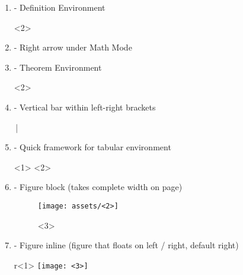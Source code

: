 \documentclass{article}
\begin{document}
\begin{enumerate}
\begin{codeblock}[tex]
\left\{ <1> \right\}
\end{codeblock}
    \item {} - Definition Environment
\begin{codeblock}[tex]
\begin{definition}[<1>]
    <2>
\end{definition}
\end{codeblock}
    \item {} - Right arrow under Math Mode
\begin{codeblock}[tex]
\rightarrow
\end{codeblock}
    \item {} - Theorem Environment
\begin{codeblock}[tex]
\begin{theorem}[<1>]
    <2>
\end{theorem}
\end{codeblock}
    \item {} - Vertical bar within left-right brackets
\begin{codeblock}[tex]
\,\middle |\,
\end{codeblock}
    \item {} - Quick framework for tabular environment
\begin{codeblock}[tex]
\begin{center}
\begin{tabular}{<1>}
    <2>
\end{tabular}
\end{center}
\end{codeblock}
    \item {} - Figure block (takes complete width on page)
\begin{codeblock}[tex]
\begin{figure}[ht]
   \begin{center}
   \centering\texttt{[image: assets/<2>]}
   \caption{\color{\captionColor} <3>}
   \end{center}
\end{figure}
\end{codeblock}
    \item {} - Figure inline (figure that floats on left / right, default right)
\begin{codeblock}[tex]
\begin{wrapfigure}{r}{<1>\textwidth}
    \centering\texttt{[image: <3>]}
\end{wrapfigure}
\end{codeblock}
\end{enumerate}
\end{document}
